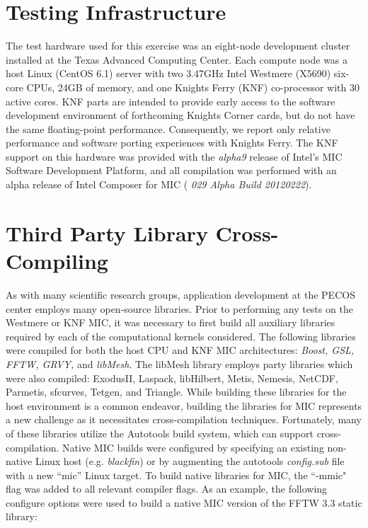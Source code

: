 \section{Testing Infrastructure}
\label{sec:hardware}

The test hardware used for this exercise was an eight-node
development cluster installed at the Texas Advanced Computing Center.
Each compute node was a host Linux (CentOS 6.1)
server with two 3.47GHz Intel Westmere (X5690) six-core CPUs, 24GB of
memory, and one Knights Ferry (KNF) co-processor with 30 active cores.
KNF parts are intended to
provide early access to the software development
environment of forthcoming Knights Corner cards, but do not have
the same floating-point performance.  Consequently, we report only
relative performance and software porting experiences with
Knights Ferry.  The KNF support on this hardware
was provided with the {\em alpha9} release of Intel's MIC Software
Development Platform, and all compilation was performed with an alpha
release of Intel Composer for MIC ({\em 
  029 Alpha Build 20120222}). 

\section{Third Party Library Cross-Compiling} \label{sec:cross_compile}

As with many scientific research groups, application development at
the PECOS center employs many open-source libraries.  Prior to
performing any tests on the Westmere or KNF MIC, it was necessary to
first build all auxiliary libraries required by each of the
computational kernels considered.  The following libraries were
compiled for both the host CPU and KNF MIC architectures: {\em Boost,
GSL, FFTW\cite{FFTW05}, GRVY,} and
{\em libMesh}. The libMesh library employs  party libraries which
were also compiled: 
ExodusII, Laspack, libHilbert, Metis, Nemesis, NetCDF,
Parmetis, sfcurves, Tetgen, and Triangle.
%
While building these libraries for the host environment is
a common endeavor, building the libraries for MIC
represents a new challenge as it necessitates cross-compilation
techniques.
Fortunately, many of these libraries utilize the
Autotools build system, which can support cross-compilation.
Native MIC builds were configured by
specifying an existing non-native Linux host
(e.g. {\em blackfin}) or by augmenting the autotools {\em config.sub}
file with a new ``mic'' Linux target.
To build native libraries for MIC, the ``-mmic"
flag was added to all relevant compiler flags.
As an example, the following configure options were used to build a
native MIC version of the FFTW 3.3 static library:

